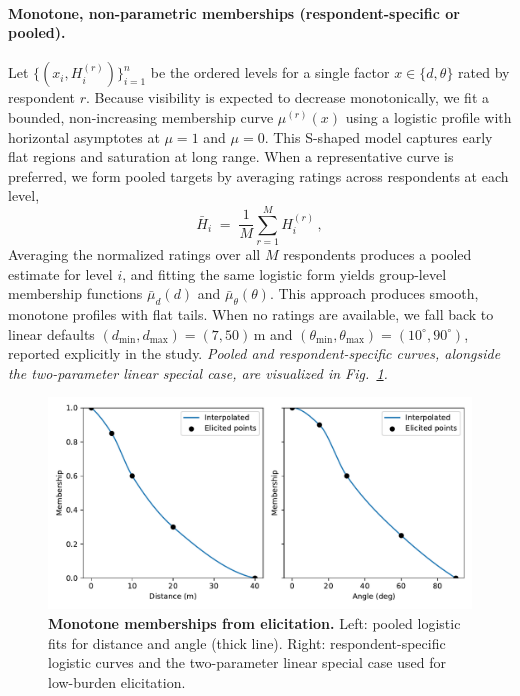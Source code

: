 \documentclass[final,3p,times,review]{elsarticle}
\begin{document}
\paragraph{Monotone, non-parametric memberships (respondent-specific or pooled).}
Let $\{(x_i,H^{(r)}_i)\}_{i=1}^{n}$ be the ordered levels for a single factor $x\!\in\!\{d,\theta\}$ rated by respondent $r$. Because visibility is expected to decrease monotonically, we fit a bounded, non-increasing membership curve $\mu^{(r)}(x)$ using a logistic profile with horizontal asymptotes at $\mu{=}1$ and $\mu{=}0$. This S-shaped model captures early flat regions and saturation at long range. When a representative curve is preferred, we form pooled targets by averaging ratings across respondents at each level,
\begin{equation}
\bar{H}_i \;=\; \frac{1}{M}\sum_{r=1}^{M} H^{(r)}_i \,,
\label{eq:pooled-mean}
\end{equation}
Averaging the normalized ratings over all $M$ respondents produces a pooled estimate for level $i$, and fitting the same logistic form yields group-level membership functions $\bar{\mu}_d(d)$ and $\bar{\mu}_\theta(\theta)$. This approach produces smooth, monotone profiles with flat tails. When no ratings are available, we fall back to linear defaults $(d_{\min},d_{\max})=(7,50)$\,m and $(\theta_{\min},\theta_{\max})=(10^\circ,90^\circ)$, reported explicitly in the study. \textit{Pooled and respondent-specific curves, alongside the two-parameter linear special case, are visualized in Fig.~\ref{fig:memberships}.}

\begin{figure}[t]
  \centering
  \includegraphics[width=\linewidth]{fig6_memberships.pdf}
  \caption{\textbf{Monotone memberships from elicitation.} Left: pooled logistic fits for distance and angle (thick line). Right: respondent-specific logistic curves and the two-parameter linear special case used for low-burden elicitation.}
  \label{fig:memberships}
\end{figure}
\end{document}
